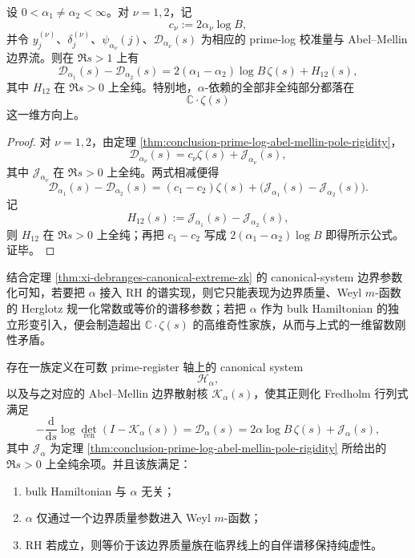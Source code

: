 \begin{corollary}[维数参数的非全纯依赖只有一维边界方向]\label{cor:conclusion-prime-log-alpha-singular-rank-one}
设 \(0<\alpha_1\neq \alpha_2<\infty\)。对 \(\nu=1,2\)，记
\[
c_\nu:=2\alpha_\nu\log B,
\]
并令 \(y_j^{(\nu)}\)、\(\delta_j^{(\nu)}\)、\(\psi_{\alpha_\nu}(j)\)、\(\mathcal D_{\alpha_\nu}(s)\) 为相应的 prime-log 校准量与 Abel--Mellin 边界流。则在 \(\Re s>1\) 上有
\[
\mathcal D_{\alpha_1}(s)-\mathcal D_{\alpha_2}(s)
=
2(\alpha_1-\alpha_2)\log B\,\zeta(s)+H_{12}(s),
\]
其中 \(H_{12}\) 在 \(\Re s>0\) 上全纯。特别地，\(\alpha\)-依赖的全部非全纯部分都落在
\[
\mathbb C\cdot \zeta(s)
\]
这一维方向上。
\end{corollary}
\begin{proof}
对 \(\nu=1,2\)，由定理 \ref{thm:conclusion-prime-log-abel-mellin-pole-rigidity}，
\[
\mathcal D_{\alpha_\nu}(s)
=
c_\nu\zeta(s)+\mathcal J_{\alpha_\nu}(s),
\]
其中 \(\mathcal J_{\alpha_\nu}\) 在 \(\Re s>0\) 上全纯。两式相减便得
\[
\mathcal D_{\alpha_1}(s)-\mathcal D_{\alpha_2}(s)
=
(c_1-c_2)\zeta(s)
+\bigl(\mathcal J_{\alpha_1}(s)-\mathcal J_{\alpha_2}(s)\bigr).
\]
记
\[
H_{12}(s):=\mathcal J_{\alpha_1}(s)-\mathcal J_{\alpha_2}(s),
\]
则 \(H_{12}\) 在 \(\Re s>0\) 上全纯；再把 \(c_1-c_2\) 写成 \(2(\alpha_1-\alpha_2)\log B\) 即得所示公式。证毕。
\end{proof}

结合定理 \ref{thm:xi-debranges-canonical-extreme-zk} 的 canonical-system 边界参数化可知，若要把 \(\alpha\) 接入 RH 的谱实现，则它只能表现为边界质量、Weyl \(m\)-函数的 Herglotz 规一化常数或等价的谱移参数；若把 \(\alpha\) 作为 bulk Hamiltonian 的独立形变引入，便会制造超出 \(\mathbb C\cdot\zeta(s)\) 的高维奇性家族，从而与上式的一维留数刚性矛盾。

\begin{conjecture}\label{conj:conclusion-prime-log-boundary-mass-canonical-system}
存在一族定义在可数 prime-register 轴上的 canonical system
\[
\mathcal H_\alpha,
\]
以及与之对应的 Abel--Mellin 边界散射核 \(\mathcal K_\alpha(s)\)，使其正则化 Fredholm 行列式满足
\[
-\frac{\mathrm d}{\mathrm ds}\log \det_{\mathrm{ren}}(I-\mathcal K_\alpha(s))
=
\mathcal D_\alpha(s)
=
2\alpha\log B\,\zeta(s)+\mathcal J_\alpha(s),
\]
其中 \(\mathcal J_\alpha\) 为定理 \ref{thm:conclusion-prime-log-abel-mellin-pole-rigidity} 所给出的 \(\Re s>0\) 上全纯余项。并且该族满足：
\begin{enumerate}
  \item bulk Hamiltonian 与 \(\alpha\) 无关；
  \item \(\alpha\) 仅通过一个边界质量参数进入 Weyl \(m\)-函数；
  \item RH 若成立，则等价于该边界质量族在临界线上的自伴谱移保持纯虚性。
\end{enumerate}
\end{conjecture}

